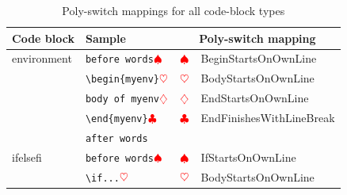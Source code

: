 	\clearpage
	\begin{longtable}{llll}
		\caption{Poly-switch mappings for all code-block types}\label{tab:poly-switch-mapping}                                                                                                                                                         \\
		\toprule
		Code block                                             & Sample                                                                  & \multicolumn{2}{c}{Poly-switch mapping}                                                                     \\
		\midrule
		environment                                            & \verb!before words!$\color{red}\spadesuit$                       & $\color{red}\spadesuit$                 & BeginStartsOnOwnLine                                              \\
		                                                       & \verb!\begin{myenv}!$\color{red}\heartsuit$                        & $\color{red}\heartsuit$                  & BodyStartsOnOwnLine                                               \\
		                                                       & \verb!body of myenv!$\color{red}\diamondsuit$                         & $\color{red}\diamondsuit$                   & EndStartsOnOwnLine                                                \\
		                                                       & \verb!\end{myenv}!$\color{red}\clubsuit$                   & $\color{red}\clubsuit$             & EndFinishesWithLineBreak                                          \\
		                                                       & \verb!after words!                                              &                                         &                                                                   \\
		\cmidrule{2-4}
		ifelsefi                                               & \verb!before words!$\color{red}\spadesuit$                       & $\color{red}\spadesuit$                 & IfStartsOnOwnLine                                                 \\
		                                                       & \verb!\if...!$\color{red}\heartsuit$                        & $\color{red}\heartsuit$                  & BodyStartsOnOwnLine                                               \\

\end{longtable}

